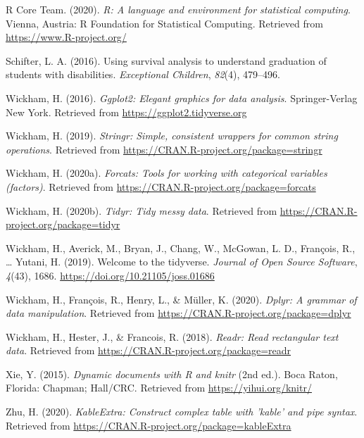 \documentclass[
  english,
  man, fleqn, noextraspace]{apa6}
\begin{document}
\leavevmode\hypertarget{ref-R-base}{}%
R Core Team. (2020). \emph{R: A language and environment for statistical computing}. Vienna, Austria: R Foundation for Statistical Computing. Retrieved from \url{https://www.R-project.org/}

\leavevmode\hypertarget{ref-schifter2016using}{}%
Schifter, L. A. (2016). Using survival analysis to understand graduation of students with disabilities. \emph{Exceptional Children}, \emph{82}(4), 479--496.

\leavevmode\hypertarget{ref-R-ggplot2}{}%
Wickham, H. (2016). \emph{Ggplot2: Elegant graphics for data analysis}. Springer-Verlag New York. Retrieved from \url{https://ggplot2.tidyverse.org}

\leavevmode\hypertarget{ref-R-stringr}{}%
Wickham, H. (2019). \emph{Stringr: Simple, consistent wrappers for common string operations}. Retrieved from \url{https://CRAN.R-project.org/package=stringr}

\leavevmode\hypertarget{ref-R-forcats}{}%
Wickham, H. (2020a). \emph{Forcats: Tools for working with categorical variables (factors)}. Retrieved from \url{https://CRAN.R-project.org/package=forcats}

\leavevmode\hypertarget{ref-R-tidyr}{}%
Wickham, H. (2020b). \emph{Tidyr: Tidy messy data}. Retrieved from \url{https://CRAN.R-project.org/package=tidyr}

\leavevmode\hypertarget{ref-R-tidyverse}{}%
Wickham, H., Averick, M., Bryan, J., Chang, W., McGowan, L. D., François, R., \ldots{} Yutani, H. (2019). Welcome to the tidyverse. \emph{Journal of Open Source Software}, \emph{4}(43), 1686. \url{https://doi.org/10.21105/joss.01686}

\leavevmode\hypertarget{ref-R-dplyr}{}%
Wickham, H., François, R., Henry, L., \& Müller, K. (2020). \emph{Dplyr: A grammar of data manipulation}. Retrieved from \url{https://CRAN.R-project.org/package=dplyr}

\leavevmode\hypertarget{ref-R-readr}{}%
Wickham, H., Hester, J., \& Francois, R. (2018). \emph{Readr: Read rectangular text data}. Retrieved from \url{https://CRAN.R-project.org/package=readr}

\leavevmode\hypertarget{ref-R-knitr}{}%
Xie, Y. (2015). \emph{Dynamic documents with R and knitr} (2nd ed.). Boca Raton, Florida: Chapman; Hall/CRC. Retrieved from \url{https://yihui.org/knitr/}

\leavevmode\hypertarget{ref-R-kableExtra}{}%
Zhu, H. (2020). \emph{KableExtra: Construct complex table with 'kable' and pipe syntax}. Retrieved from \url{https://CRAN.R-project.org/package=kableExtra}

\endgroup
\end{document}
